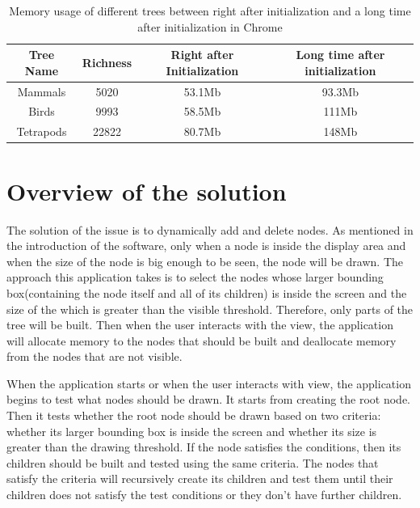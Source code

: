 \documentclass[a4paper,11pt,twoside]{report}
\begin{document}
\begin{table} [H]
	\centering %
	\begin{tabular}{|c c c c|} %
		\hline %
		Tree Name & Richness  & Right after Initialization & Long time after initialization\\ %
		\hline  %
		Mammals & 5020 &  53.1Mb & 93.3Mb\\  %
		\hline
		Birds & 9993 &  58.5Mb & 111Mb\\
		\hline
		Tetrapods & 22822 & 80.7Mb & 148Mb\\  [1ex] %
		\hline
	\end{tabular}
	\label{table:nonlin} %
	\caption{Memory usage of different trees between right after initialization and a long time after 
	initialization in Chrome } %
\end{table}


\section{Overview of the solution}

The solution of the issue is to dynamically add and delete nodes. As mentioned in the introduction of the software, only when a node is inside the display area and when the size of the node is big enough to be seen, the node will be drawn. The approach this application takes is to select the nodes whose larger bounding box(containing the node itself and all of its children) is inside the screen and the size of the which is greater than the visible threshold. Therefore, only parts of the tree will be built. Then when the user interacts with the view, the application will allocate memory to the nodes that should be built and deallocate memory from the nodes that are not visible.

When the application starts or when the user interacts with view, the application begins to test what nodes should be drawn. It starts from creating the root node. Then it tests whether the root node should be drawn based on two criteria: whether its larger bounding box is inside the screen and whether its size is greater than the drawing threshold. If the node satisfies the conditions, then its children should be built and tested using the same criteria. The nodes that satisfy the criteria will recursively create its children and test them until their children does not satisfy the test conditions or they don't have further children. 
\end{document}
